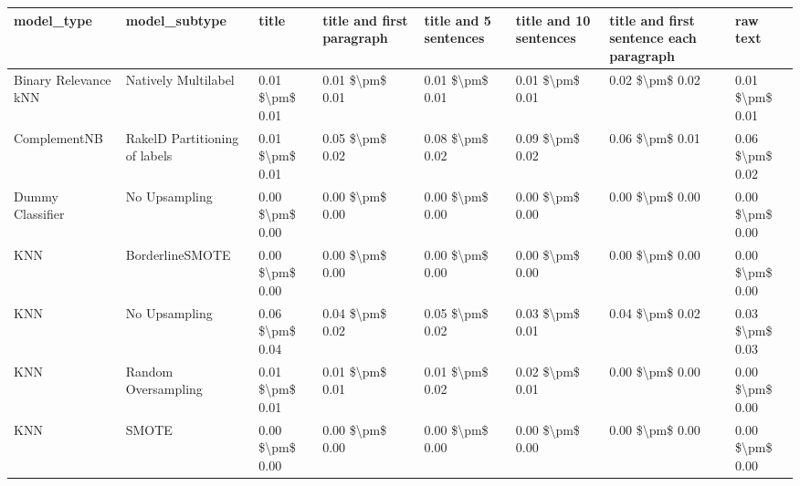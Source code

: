 \begin{tabular}{llllllll}
\toprule
                     model\_type &                 model\_subtype &           title & title and first paragraph & title and 5 sentences & title and 10 sentences & title and first sentence each paragraph &            raw text \\
\midrule
           Binary Relevance kNN &           Natively Multilabel & 0.01 \$\textbackslash pm\$ 0.01 &           0.01 \$\textbackslash pm\$ 0.01 &       0.01 \$\textbackslash pm\$ 0.01 &        0.01 \$\textbackslash pm\$ 0.01 &                         0.02 \$\textbackslash pm\$ 0.02 &     0.01 \$\textbackslash pm\$ 0.01 \\
                   ComplementNB & RakelD Partitioning of labels & 0.01 \$\textbackslash pm\$ 0.01 &           0.05 \$\textbackslash pm\$ 0.02 &       0.08 \$\textbackslash pm\$ 0.02 &        0.09 \$\textbackslash pm\$ 0.02 &                         0.06 \$\textbackslash pm\$ 0.01 &     0.06 \$\textbackslash pm\$ 0.02 \\
               Dummy Classifier &                 No Upsampling & 0.00 \$\textbackslash pm\$ 0.00 &           0.00 \$\textbackslash pm\$ 0.00 &       0.00 \$\textbackslash pm\$ 0.00 &        0.00 \$\textbackslash pm\$ 0.00 &                         0.00 \$\textbackslash pm\$ 0.00 &     0.00 \$\textbackslash pm\$ 0.00 \\
                            KNN &               BorderlineSMOTE & 0.00 \$\textbackslash pm\$ 0.00 &           0.00 \$\textbackslash pm\$ 0.00 &       0.00 \$\textbackslash pm\$ 0.00 &        0.00 \$\textbackslash pm\$ 0.00 &                         0.00 \$\textbackslash pm\$ 0.00 &     0.00 \$\textbackslash pm\$ 0.00 \\
                            KNN &                 No Upsampling & 0.06 \$\textbackslash pm\$ 0.04 &           0.04 \$\textbackslash pm\$ 0.02 &       0.05 \$\textbackslash pm\$ 0.02 &        0.03 \$\textbackslash pm\$ 0.01 &                         0.04 \$\textbackslash pm\$ 0.02 &     0.03 \$\textbackslash pm\$ 0.03 \\
                            KNN &           Random Oversampling & 0.01 \$\textbackslash pm\$ 0.01 &           0.01 \$\textbackslash pm\$ 0.01 &       0.01 \$\textbackslash pm\$ 0.02 &        0.02 \$\textbackslash pm\$ 0.01 &                         0.00 \$\textbackslash pm\$ 0.00 &     0.00 \$\textbackslash pm\$ 0.00 \\
                            KNN &                         SMOTE & 0.00 \$\textbackslash pm\$ 0.00 &           0.00 \$\textbackslash pm\$ 0.00 &       0.00 \$\textbackslash pm\$ 0.00 &        0.00 \$\textbackslash pm\$ 0.00 &                         0.00 \$\textbackslash pm\$ 0.00 &     0.00 \$\textbackslash pm\$ 0.00 \\

\end{tabular}
